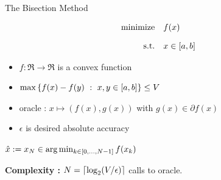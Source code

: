 \documentclass[9pt]{beamer}
\begin{document}
\begin{frame}{The Bisection Method}

  \begin{minipage}{0.4\textwidth}
    \begin{equation*}
      \begin{array}{rl}
        \operatorname{minimize} & f(x) \\[1em]
        \mathrm{s.t.} & x \in [a, b]
      \end{array}
    \end{equation*}
  \end{minipage}%
  \hfill
  \begin{minipage}{0.55\textwidth}
    \begin{itemize}
    \item $f:\Re\to\Re$ is a convex function
    \item $\max \left\{ f(x)-f(y)\ : \ x, y\in [a, b] \right\} \leq V$
    \item oracle : $x\mapsto (f(x), g(x))$ with $g(x) \in \partial f(x)$
    \item $\epsilon$ is desired absolute accuracy
    \end{itemize}
  \end{minipage}

  \vfill
  
  \begin{algorithm}[H]
    \Return $\hat x := x_N \in \arg\min_{k\in[0,\dots,N-1]} f(x_k)$
    \caption{Bisection}
  \end{algorithm}

  \vfill

  \textbf{Complexity : } $N=\left\lceil \log_2(V/\epsilon)\right\rceil$ calls to oracle.

\end{frame}
\end{document}
